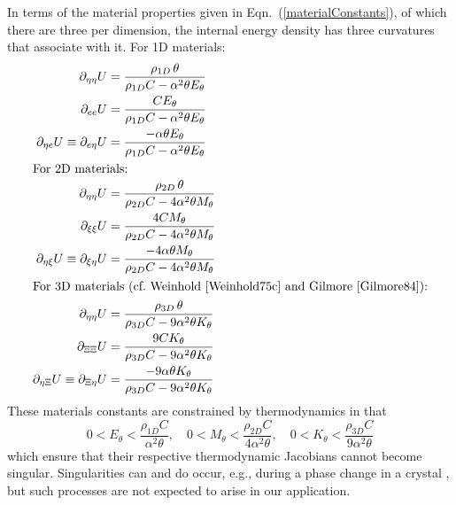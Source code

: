 In terms of the material properties given in Eqn.~(\ref{materialConstants}), of which there are three per dimension, the internal energy density has three curvatures that associate with it.  For 1D materials:
\begin{subequations}
    \label{internalEnergies}
    \begin{align}
    \partial_{\eta\eta} U & = 
    \frac{\rho_{1D} \, \theta}
    {\rho_{1D} C - \alpha^2 \theta E_{\theta}} \\
    \partial_{ee} U & = \frac{C E_{\theta}}
    {\rho_{1D} C - \alpha^2 \theta E_{\theta}} \\
    \partial_{\eta e} U \equiv \partial_{e \eta} U & = 
    \frac{-\alpha \theta E_{\theta}}
    {\rho_{1D} C - \alpha^2 \theta E_{\theta}} \\
    \intertext{For 2D materials:}
    \partial_{\eta\eta} U & = 
    \frac{\rho_{2D} \, \theta}
    {\rho_{2D} C - 4 \alpha^2 \theta M_{\theta}} \\
    \partial_{\xi\xi} U & = \frac{4 C M_{\theta}}
    {\rho_{2D} C - 4 \alpha^2 \theta M_{\theta}} \\
    \partial_{\eta \xi} U \equiv \partial_{\xi \eta} U & = 
    \frac{-4 \alpha \theta M_{\theta}}
    {\rho_{2D} C - 4 \alpha^2 \theta M_{\theta}} \\
    \intertext{For 3D materials (cf.\ Weinhold \cite{Weinhold75c} and Gilmore \cite{Gilmore84}):}
    \partial_{\eta\eta} U & = 
    \frac{\rho_{3D} \, \theta}
    {\rho_{3D} C - 9 \alpha^2 \theta K_{\theta}} \\
    \partial_{\Xi\Xi} U & = \frac{9 C K_{\theta}}
    {\rho_{3D} C - 9 \alpha^2 \theta K_{\theta}} \\
    \partial_{\eta\Xi} U \equiv 
    \partial_{\Xi\eta} U & = 
    \frac{-9 \alpha \theta K_{\theta}}
    {\rho_{3D} C - 9 \alpha^2 \theta K_{\theta}}
    \end{align}
\end{subequations}
These materials constants are constrained by thermo\-dynamics in that
\begin{equation}
    \label{thermodynamicConstraints}
    0 < E_{\theta} < \frac{\rho_{1D} C}{\alpha^2 \theta} , \quad
    0 < M_{\theta} < \frac{\rho_{2D} C}{4 \alpha^2 \theta} , \quad
    0 < K_{\theta} < \frac{\rho_{3D} C}{9 \alpha^2 \theta} 
\end{equation} 
which ensure that their respective thermo\-dynamic Jacobians cannot become singular. Singularities can and do occur, e.g., during a phase change in a crystal \cite{McLellan76,Gilmore84}, but such processes are not expected to arise in our application.


